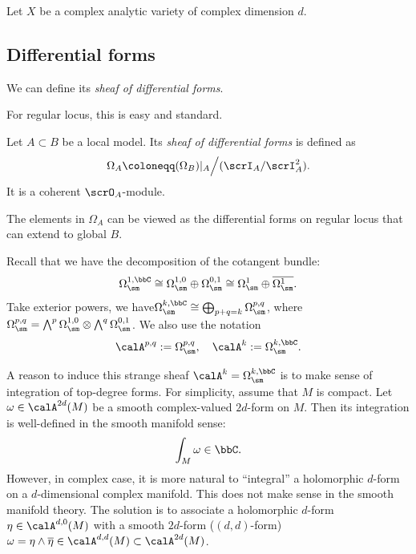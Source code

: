 

Let \(X\) be a complex analytic variety of complex dimension \(d\).

\subsection{Differential forms}

We can define its \emph{sheaf of differential forms}.

For regular locus, this is easy and standard.

\begin{definition}
	Let $A \subset B$ be a local model.
	Its \emph{sheaf of differential forms} is defined as
	\[ \Omega_A \coloneqq (\Omega_B)|_A \Big/ (\scrI_A/\scrI_A^2). \]
	It is a coherent $\scrO_A$-module.
	\Yang{}
\end{definition}


The elements in $\Omega_A$ can be viewed as the differential forms on regular locus that can extend to global $B$.








Recall that we have the decomposition of the cotangent bundle:
\[ \Omega_{\sm}^{1,\bbC} \cong \Omega_{\sm}^{1,0} \oplus \Omega_{\sm}^{0,1} \cong \Omega_{\sm}^1 \oplus \overline{\Omega_{\sm}^1}. \]
Take exterior powers, we have\( \Omega_{\sm}^{k,\bbC} \cong \bigoplus_{p+q=k} \Omega_{\sm}^{p,q} \),
where \(\Omega_{\sm}^{p,q} = \bigwedge^p \Omega_{\sm}^{1,0} \otimes \bigwedge^q \Omega_{\sm}^{0,1}\).
We also use the notation
\[ \calA^{p,q} := \Omega_{\sm}^{p,q}, \quad \calA^{k} := \Omega_{\sm}^{k,\bbC}. \]

A reason to induce this strange sheaf \(\calA^{k} = \Omega_{\sm}^{k,\bbC}\) is to make sense of integration of top-degree forms.
For simplicity, assume that \(M\) is compact.
Let \(\omega \in \calA^{2d}(M)\) be a smooth complex-valued \(2d\)-form on \(M\).
Then its integration is well-defined in the smooth manifold sense:
\[ \int_M \omega \in \bbC. \]
However, in complex case, it is more natural to ``integral'' a holomorphic \(d\)-form on a \(d\)-dimensional complex manifold.
This does not make sense in the smooth manifold theory.
The solution is to associate a holomorphic \(d\)-form \(\eta \in \calA^{d,0}(M)\) with a smooth \(2d\)-form (\((d,d)\)-form) \(\omega = \eta \wedge \overline{\eta} \in \calA^{d,d}(M) \subset \calA^{2d}(M)\).

